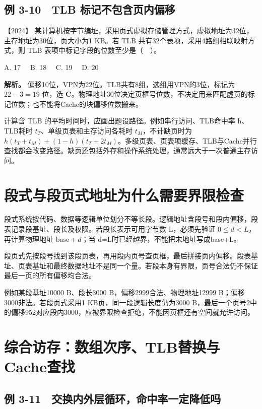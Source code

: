 \subsection{例 3-10　TLB 标记不包含页内偏移}\label{co-ex3-10}

\noindent{}【2024】 某计算机按字节编址，采用页式虚拟存储管理方式，虚拟地址为32位，主存地址为30位，页大小为1 KB。若 TLB 共有32个表项，采用4路组相联映射方式，则 TLB 表项中标记字段的位数至少是（　）。

A. 17　 B. 18　 C. 19　 D. 20


\textbf{解析。} 偏移10位，VPN为22位。TLB共有8组，选组用VPN的3位，标记为 \(22-3=19\) 位，选 \textbf{C}。物理地址30位决定页框号位数，不决定用来匹配虚页的标记位数；也不能将Cache的块偏移位数搬来。

计算含 TLB 的平均时间时，应画出题设路径。例如串行访问、TLB命中率 h、TLB耗时 \(t_T\)、单级页表和主存访问各耗时 \(t_M\)，不计缺页时为 \(h(t_T+t_M)+(1-h)(t_T+2t_M)\)。多级页表、页表项缓存、TLB与Cache并行查找都会改变路径。缺页还包括外存和操作系统处理，通常远大于一次普通主存访问。

\section{段式与段页式地址为什么需要界限检查}\label{co-03-13}

段式系统按代码、数据等逻辑单位划分不等长段。逻辑地址含段号和段内偏移，段表记录段基址、段长及权限。若段长表示可用字节数 L，必须先验证 \(0\le d<L\)，再计算物理地址 \(\mathrm{base}+d\)；当 d=L时已经越界，不能把末地址写成base+L。

段页式先按段号找到该段页表，再用段内页号查页框，最后拼接页内偏移。段表基址、页表基址和最终数据地址不是同一个量。若段本身有界限，页号合法仍不保证最后一页的所有偏移均合法。

例如某段基址10000 B、段长3000 B，偏移2999合法、物理地址12999 B；偏移3000非法。若段页式采用1 KB页，同一段逻辑长度仍为3000 B，最后一个页号2中的偏移952对应段内3000，应被界限检查拒绝，不能因页框还有空间就允许访问。

\section{综合访存：数组次序、TLB替换与Cache查找}\label{co-memory-synthesis}

\subsection{例 3-11　交换内外层循环，命中率一定降低吗}\label{co-ex3-11}

